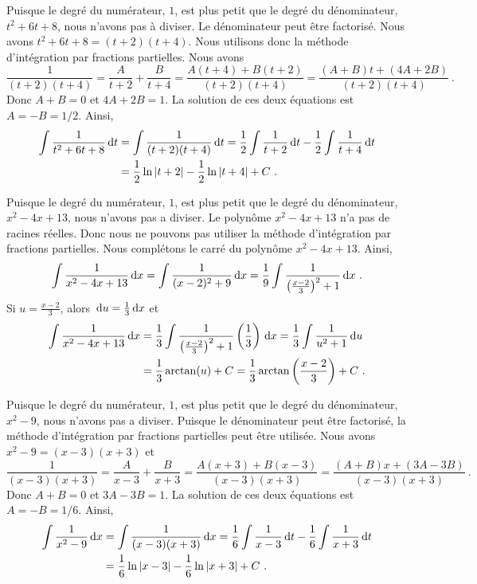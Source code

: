 {
Puisque le degré du numérateur, $1$, est plus petit que le degré du
dénominateur, $t^2+6t+8$, nous n'avons pas à diviser.  Le dénominateur peut
être factorisé.  Nous avons $t^2+6t+8 = (t+2)(t+4)$.  Nous utilisons donc la
méthode d'intégration par fractions partielles.  Nous avons
\[
\frac{1}{(t+2)(t+4)} = \frac{A}{t+2} + \frac{B}{t+4}
=\frac{A(t+4)+B(t+2)}{(t+2)(t+4)}
=\frac{(A+B)t + (4A+2B)}{(t+2)(t+4)} \ .
\]
Donc $A+B=0$ et $4A+2B=1$.  La solution de ces deux équations est
$A = -B = 1/2$.  Ainsi,
\begin{align*}
\int \frac{1}{t^2+6t+8} \,\mathrm{d}t &= \int \frac{1}{(t+2)(t+4)} \,\mathrm{d}t
= \frac{1}{2} \int \frac{1}{t+2} \,\mathrm{d}t
- \frac{1}{2} \int \frac{1}{t+4} \,\mathrm{d}t \\
&= \frac{1}{2} \ln|t+2| - \frac{1}{2} \ln|t+4| + C \ .
\end{align*}

Puisque le degré du numérateur, $1$, est plus petit que le degré du
dénominateur, $x^2-4x+13$, nous n'avons pas a diviser.  Le polynôme
$x^2-4x+13$ n'a pas de racines réelles.  Donc nous ne pouvons pas
utiliser la méthode d'intégration par fractions partielles.  Nous
complétons le carré du polynôme $x^2-4x+13$.  Ainsi,
\[
\int \frac{1}{x^2-4x+13} \dx{x}
= \int \frac{1}{(x-2)^2 + 9} \dx{x}
= \frac{1}{9} \int \frac{1}{ \left( \frac{x-2}{3}\right)^2 + 1} \dx{x} \ .
\]
Si $\displaystyle u= \frac{x-2}{3}$, alors
$\,\mathrm{d}u = \frac{1}{3}\,\mathrm{d}x$ et
\begin{align*}
\int \frac{1}{x^2-4x+13} \,\mathrm{d}x
&= \frac{1}{3}
\int \frac{1}{ \left( \frac{x-2}{3}\right)^2 + 1}
\left(\frac{1}{3}\right)\,\mathrm{d}x
= \frac{1}{3} \int \frac{1}{u^2 + 1} \,\mathrm{d}u \\
&= \frac{1}{3} \arctan(u) + C
= \frac{1}{3} \arctan\left(\frac{x-2}{3}\right) + C \ .
\end{align*}

Puisque le degré du numérateur, $1$, est plus petit que le degré du
dénominateur, $x^2-9$, nous n'avons pas a diviser.
Puisque le dénominateur peut être factorisé, la méthode d'intégration par
fractions partielles peut être utilisée.  Nous avons
$x^2-9 = (x-3)(x+3)$ et
\[
\frac{1}{(x-3)(x+3)} = \frac{A}{x-3} + \frac{B}{x+3}
=\frac{A(x+3)+B(x-3)}{(x-3)(x+3)}
=\frac{(A+B)x + (3A-3B)}{(x-3)(x+3)} \ .
\]
Donc $A+B=0$ et $3A-3B=1$.  La solution de ces deux équations est
$A = -B = 1/6$.  Ainsi,
\begin{align*}
\int \frac{1}{x^2-9} \,\mathrm{d}x &= \int \frac{1}{(x-3)(x+3)} \,\mathrm{d}x
= \frac{1}{6} \int \frac{1}{x-3} \,\mathrm{d}t
- \frac{1}{6} \int \frac{1}{x+3} \,\mathrm{d}t \\
&= \frac{1}{6} \ln|x-3| - \frac{1}{6} \ln|x+3| + C \ .
\end{align*}

}
